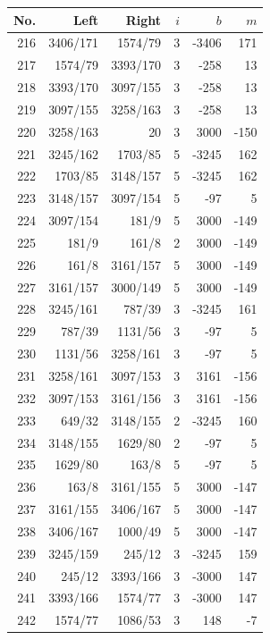 \documentclass[11pt,a4paper]{article}
\begin{document}
\begin{minipage}[t]{.49\linewidth}\centering\footnotesize\setlength{\tabcolsep}{2pt}\renewcommand{\arraystretch}{1.09}
\begin{tabular*}{\linewidth}{@{}r@{\extracolsep{\fill}}rrrrr@{}}\toprule
No. & Left & Right & $i$ & $b$ & $m$\\\midrule
216 & 3406/171 & 1574/79 & 3 & -3406 & 171\\
217 & 1574/79 & 3393/170 & 3 & -258 & 13\\
218 & 3393/170 & 3097/155 & 3 & -258 & 13\\
219 & 3097/155 & 3258/163 & 3 & -258 & 13\\
220 & 3258/163 & 20 & 3 & 3000 & -150\\
221 & 3245/162 & 1703/85 & 5 & -3245 & 162\\
222 & 1703/85 & 3148/157 & 5 & -3245 & 162\\
223 & 3148/157 & 3097/154 & 5 & -97 & 5\\
224 & 3097/154 & 181/9 & 5 & 3000 & -149\\
225 & 181/9 & 161/8 & 2 & 3000 & -149\\
226 & 161/8 & 3161/157 & 5 & 3000 & -149\\
227 & 3161/157 & 3000/149 & 5 & 3000 & -149\\
228 & 3245/161 & 787/39 & 3 & -3245 & 161\\
229 & 787/39 & 1131/56 & 3 & -97 & 5\\
230 & 1131/56 & 3258/161 & 3 & -97 & 5\\
231 & 3258/161 & 3097/153 & 3 & 3161 & -156\\
232 & 3097/153 & 3161/156 & 3 & 3161 & -156\\
233 & 649/32 & 3148/155 & 2 & -3245 & 160\\
234 & 3148/155 & 1629/80 & 2 & -97 & 5\\
235 & 1629/80 & 163/8 & 5 & -97 & 5\\
236 & 163/8 & 3161/155 & 5 & 3000 & -147\\
237 & 3161/155 & 3406/167 & 5 & 3000 & -147\\
238 & 3406/167 & 1000/49 & 5 & 3000 & -147\\
239 & 3245/159 & 245/12 & 3 & -3245 & 159\\
240 & 245/12 & 3393/166 & 3 & -3000 & 147\\
241 & 3393/166 & 1574/77 & 3 & -3000 & 147\\
242 & 1574/77 & 1086/53 & 3 & 148 & -7\\

\end{tabular*}
\end{minipage}
\end{document}
